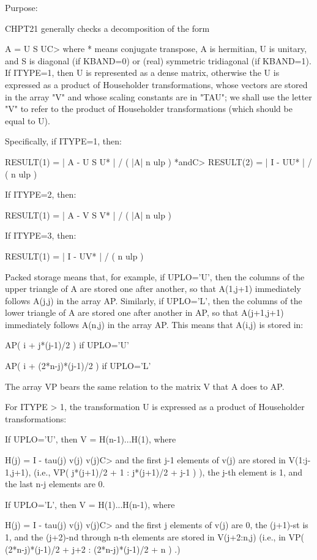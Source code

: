 \begin{DoxyParagraph}{Purpose\+: }
\begin{DoxyVerb} CHPT21  generally checks a decomposition of the form

         A = U S UC>
 where * means conjugate transpose, A is hermitian, U is
 unitary, and S is diagonal (if KBAND=0) or (real) symmetric
 tridiagonal (if KBAND=1).  If ITYPE=1, then U is represented as
 a dense matrix, otherwise the U is expressed as a product of
 Householder transformations, whose vectors are stored in the
 array "V" and whose scaling constants are in "TAU"; we shall
 use the letter "V" to refer to the product of Householder
 transformations (which should be equal to U).

 Specifically, if ITYPE=1, then:

         RESULT(1) = | A - U S U* | / ( |A| n ulp ) *andC>         RESULT(2) = | I - UU* | / ( n ulp )

 If ITYPE=2, then:

         RESULT(1) = | A - V S V* | / ( |A| n ulp )

 If ITYPE=3, then:

         RESULT(1) = | I - UV* | / ( n ulp )

 Packed storage means that, for example, if UPLO='U', then the columns
 of the upper triangle of A are stored one after another, so that
 A(1,j+1) immediately follows A(j,j) in the array AP.  Similarly, if
 UPLO='L', then the columns of the lower triangle of A are stored one
 after another in AP, so that A(j+1,j+1) immediately follows A(n,j)
 in the array AP.  This means that A(i,j) is stored in:

    AP( i + j*(j-1)/2 )                 if UPLO='U'

    AP( i + (2*n-j)*(j-1)/2 )           if UPLO='L'

 The array VP bears the same relation to the matrix V that A does to
 AP.

 For ITYPE > 1, the transformation U is expressed as a product
 of Householder transformations:

    If UPLO='U', then  V = H(n-1)...H(1),  where

        H(j) = I  -  tau(j) v(j) v(j)C>
    and the first j-1 elements of v(j) are stored in V(1:j-1,j+1),
    (i.e., VP( j*(j+1)/2 + 1 : j*(j+1)/2 + j-1 ) ),
    the j-th element is 1, and the last n-j elements are 0.

    If UPLO='L', then  V = H(1)...H(n-1),  where

        H(j) = I  -  tau(j) v(j) v(j)C>
    and the first j elements of v(j) are 0, the (j+1)-st is 1, and the
    (j+2)-nd through n-th elements are stored in V(j+2:n,j) (i.e.,
    in VP( (2*n-j)*(j-1)/2 + j+2 : (2*n-j)*(j-1)/2 + n ) .)\end{DoxyVerb}
 
\end{DoxyParagraph}


